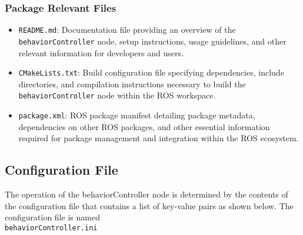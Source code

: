 \documentclass{CSSRforAfrica}
\begin{document}
\subsubsection{Package Relevant Files}
\begin{itemize}
    \item \texttt{\small README.md}: Documentation file providing an overview of the \texttt{\small behaviorController} node, setup instructions, usage guidelines, and other relevant information for developers and users.
    \item \texttt{\small CMakeLists.txt}: Build configuration file specifying dependencies, include directories, and compilation instructions necessary to build the \texttt{\small behaviorController} node within the ROS workspace.
    \item \texttt{\small package.xml}: ROS package manifest detailing package metadata, dependencies on other ROS packages, and other essential information required for package management and integration within the ROS ecosystem.
\end{itemize}

\newpage
\subsection{Configuration File}
The operation of the behaviorController node is determined by the contents of the configuration file that contains a list of key-value pairs as shown below.
The configuration file is named\\
\texttt{\small behaviorController.ini}
\end{document}

